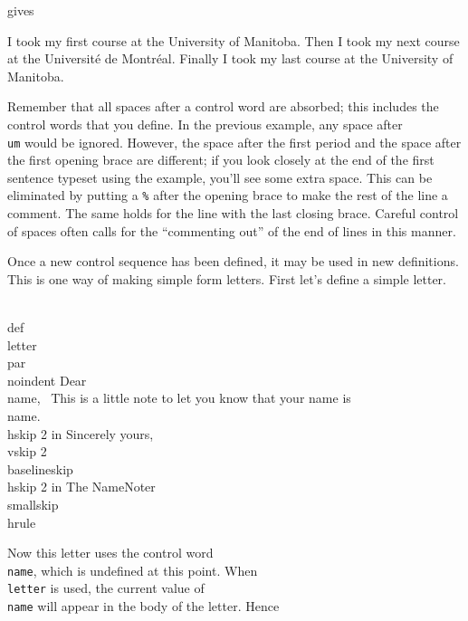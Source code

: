 \noindent gives \medskip 
 
\def\um{University of Manitoba} 
I took my first course at the \um. 
{ 
\def\um{Universit\'e de Montr\'eal} 
Then I took my next course at the \um. 
} 
Finally I took my last course at the \um. 
 
Remember that all spaces after a control word are absorbed; this 
includes the control words that you define. In the previous 
example, any space after {\tt \\um} would be ignored. However, 
the space after the first period and the space after the first 
opening brace are different; if you look closely at the end of 
the first sentence typeset using the example, you'll see some 
extra space. This can be eliminated by putting a {\tt \%} after 
the opening brace to make the rest of the line a comment. The 
same holds for the line with the last closing brace. Careful 
control of spaces often calls for the ``commenting out'' of the 
end of lines in this manner. 
 
Once a new control sequence has been defined, it may be used in 
new definitions. This is one way of making simple form letters. 
First let's define a simple letter. 
 
\beginuser 
\\def\\letter\lb 
\\par \\noindent 
Dear \\name, 
\ 
This is a little note to let you know that your name is \\name. 
\ 
\\hskip 2 in Sincerely yours, 
\\vskip 2\\baselineskip 
\\hskip 2 in The NameNoter 
\\smallskip \\hrule 
\rb 
\enduser 
 
\def\letter{ 
\par \noindent 
Dear \name, 
 
This is a little note to let you know that your name is \name. 
 
\hskip 2 in Sincerely yours, 
\vskip 2\baselineskip\nobreak 
\hskip 2 in The NameNoter 
\smallskip \hrule 
} 
 
Now this letter uses the control word {\tt \\name}, which is 
undefined at this point.  When {\tt \\letter} is used, the 
current value of {\tt \\name} will appear in the body of the 
letter. Hence 
 
